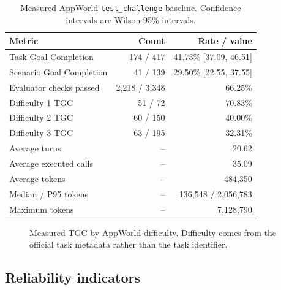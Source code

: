 \documentclass[10pt]{article}
\begin{document}
\begin{table}[t]
\centering
\caption{Measured AppWorld \texttt{test\_challenge} baseline. Confidence
intervals are Wilson 95\% intervals.}
\label{tab:appworld-main}
\small
\begin{tabular}{@{}lrr@{}}
\toprule
Metric & Count & Rate / value \\
\midrule
Task Goal Completion & 174 / 417 & 41.73\% [37.09, 46.51] \\
Scenario Goal Completion & 41 / 139 & 29.50\% [22.55, 37.55] \\
Evaluator checks passed & 2,218 / 3,348 & 66.25\% \\
Difficulty 1 TGC & 51 / 72 & 70.83\% \\
Difficulty 2 TGC & 60 / 150 & 40.00\% \\
Difficulty 3 TGC & 63 / 195 & 32.31\% \\
Average turns & -- & 20.62 \\
Average executed calls & -- & 35.09 \\
Average tokens & -- & 484,350 \\
Median / P95 tokens & -- & 136,548 / 2,056,783 \\
Maximum tokens & -- & 7,128,790 \\
\bottomrule
\end{tabular}
\end{table}

\begin{figure}[t]
\centering
{}
\caption{Measured TGC by AppWorld difficulty. Difficulty comes from the official
task metadata rather than the task identifier.}
\label{fig:difficulty}
\end{figure}

\subsection{Reliability indicators}
\end{document}
